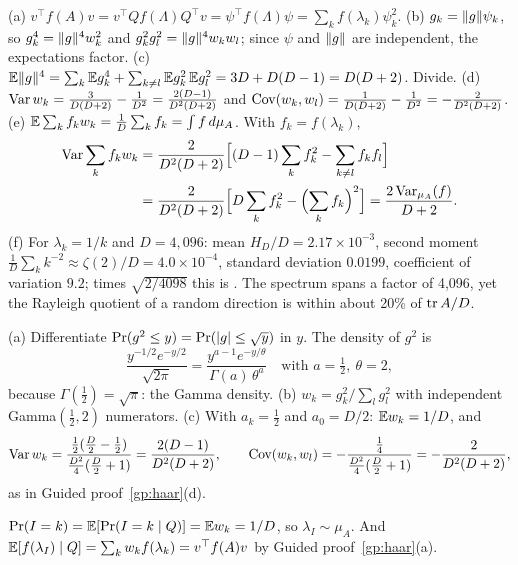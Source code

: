 (a) $v^\top f(A)v=v^\top Qf(\Lambda)Q^\top v=\psi^\top f(\Lambda)\psi=\sum_kf(\lambda_k)\psi_k^2$.
\newline (b) $g_k=\lVert g\rVert\psi_k$, so $g_k^4=\lVert g\rVert^4w_k^2$ and $g_k^2g_l^2=\lVert g\rVert^4w_kw_l$; since $\psi$ and $\lVert g\rVert$
are independent, the expectations factor.
\newline (c) $\mathbb{E}\lVert g\rVert^4=\sum_k\mathbb{E} g_k^4+\sum_{k\ne l}\mathbb{E} g_k^2\,\mathbb{E} g_l^2=3D+D(D-1)=D(D+2)$. Divide.
\newline (d) $\operatorname{Var} w_k=\frac{3}{D(D+2)}-\frac1{D^2}=\frac{2(D-1)}{D^2(D+2)}$ and $\operatorname{Cov}(w_k,w_l)=\frac1{D(D+2)}-\frac1{D^2}=-\frac{2}{D^2(D+2)}$.
\newline (e) $\mathbb{E}\sum_kf_kw_k=\frac1D\sum_kf_k=\int f\,d\mu_A$. With $f_k=f(\lambda_k)$,
\[\begin{aligned}
\operatorname{Var}\sum_kf_kw_k&=\frac{2}{D^2(D+2)}\Bigl[(D-1)\sum_kf_k^2-\sum_{k\ne l}f_kf_l\Bigr]\\
&=\frac{2}{D^2(D+2)}\Bigl[D\sum_kf_k^2-\Bigl(\sum_kf_k\Bigr)^2\Bigr]=\frac{2\operatorname{Var}_{\mu_A}(f)}{D+2}.
\end{aligned}\]
\newline (f) For $\lambda_k=1/k$ and $D=4{,}096$: mean $H_D/D=2.17\times10^{-3}$, second moment
$\frac1D\sum_kk^{-2}\approx\zeta(2)/D=4.0\times10^{-4}$, standard deviation $0.0199$, coefficient of variation $9.2$;
times $\sqrt{2/4098}$ this is \NumHaarRelSd. The spectrum spans a factor of 4{,}096, yet the Rayleigh quotient of a
random direction is within about 20\% of $\operatorname{tr} A/D$.

(a) Differentiate $\Pr(g^2\le y)=\Pr(\lvert g\rvert\le\sqrt y)$ in $y$. The density of $g^2$ is
\[\frac{y^{-1/2}e^{-y/2}}{\sqrt{2\pi}}=\frac{y^{a-1}e^{-y/\theta}}{\Gamma(a)\,\theta^a}\quad\text{with }a=\tfrac12,\ \theta=2,\]
because $\Gamma(\frac12)=\sqrt\pi$: the Gamma density.
\newline (b) $w_k=g_k^2/\sum_lg_l^2$ with independent Gamma$(\frac12,2)$ numerators.
\newline (c) With $a_k=\frac12$ and $a_0=D/2$: $\mathbb{E} w_k=1/D$, and
\[\operatorname{Var} w_k=\frac{\frac12(\frac D2-\frac12)}{\frac{D^2}4(\frac D2+1)}=\frac{2(D-1)}{D^2(D+2)},\qquad
\operatorname{Cov}(w_k,w_l)=-\frac{\frac14}{\frac{D^2}4(\frac D2+1)}=-\frac{2}{D^2(D+2)},\]
as in Guided proof~\ref{gp:haar}(d).

$\Pr(I=k)=\mathbb{E}[\Pr(I=k\mid Q)]=\mathbb{E} w_k=1/D$, so $\lambda_I\sim\mu_A$. And
$\mathbb{E}[f(\lambda_I)\mid Q]=\sum_kw_kf(\lambda_k)=v^\top f(A)v$ by Guided proof~\ref{gp:haar}(a).

